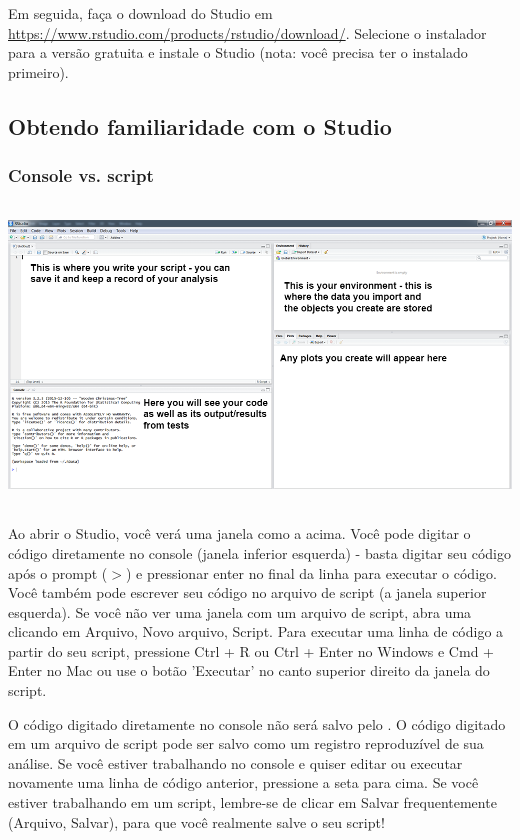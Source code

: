 \documentclass{article}
\begin{document}
Em seguida, faça o download do \faRProject Studio em \href{https://www.rstudio.com/products/rstudio/download/}{https://www.rstudio.com/products/rstudio/download/}. Selecione o instalador para a versão gratuita e instale o \faRProject Studio (nota: você precisa ter o \faRProject instalado primeiro).

\subsection{Obtendo familiaridade com o \faRProject Studio}
\subsubsection{Console vs. script}

\includegraphics[widht=8cm,height=8cm]{rstudio.png}

Ao abrir o \faRProject Studio, você verá uma janela como a acima. Você pode digitar o código diretamente no console (janela inferior esquerda) - basta digitar seu código após o prompt ($>$) e pressionar enter no final da linha para executar o código. Você também pode escrever seu código no arquivo de script (a janela superior esquerda). Se você não ver uma janela com um arquivo de script, abra uma clicando em Arquivo, Novo arquivo, \faRProject Script. Para executar uma linha de código a partir do seu script, pressione Ctrl + R ou Ctrl + Enter no Windows e Cmd + Enter no Mac ou use o botão 'Executar' no canto superior direito da janela do script.

O código digitado diretamente no console não será salvo pelo \faRProject. O código digitado em um arquivo de script pode ser salvo como um registro reproduzível de sua análise. Se você estiver trabalhando no console e quiser editar ou executar novamente uma linha de código anterior, pressione a seta para cima. Se você estiver trabalhando em um script, lembre-se de clicar em Salvar frequentemente (Arquivo, Salvar), para que você realmente salve o seu script!
\end{document}
